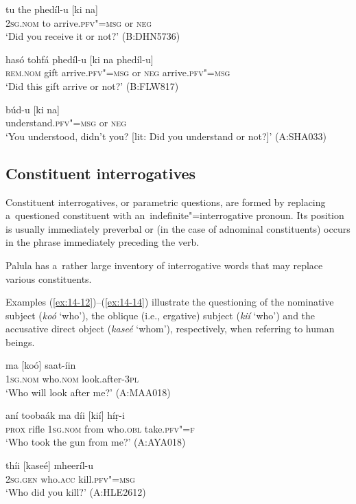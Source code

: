 \begin{exe}
\ex
\label{ex:14-9}
\gll tu the phedíl-u [ki na] \\
\textsc{2sg.nom} to arrive.\textsc{pfv"=msg} or \textsc{neg} \\
\glt `Did you receive it or not?' (B:DHN5736)

\ex
\label{ex:14-10}
\gll hasó tohfá phedíl-u [ki na phedíl-u]  \\
\textsc{rem.nom} gift arrive.\textsc{pfv"=msg} or \textsc{neg}  arrive.\textsc{pfv"=msg} \\
\glt `Did this gift arrive or not?' (B:FLW817)

\ex
\label{ex:14-11}
\gll búd-u [ki na] \\
understand.\textsc{pfv"=msg} or \textsc{neg} \\
\glt `You understood, didn't you? [lit: Did you understand or not?]' (A:SHA033)
\end{exe}
\subsection{Constituent interrogatives}
\label{subsec:14-2-2}

Constituent interrogatives, or parametric questions, are formed by replacing a~questioned constituent with an~indefinite"=interrogative pronoun. Its position is usually immediately preverbal or (in the case of adnominal constituents) occurs in the phrase immediately preceding the verb.


Palula has a~rather large inventory of interrogative words that may replace various constituents.


 Examples (\ref{ex:14-12})--(\ref{ex:14-14}) illustrate the questioning of the nominative subject (\textit{koó} `who'), the oblique (i.e., ergative) subject (\textit{kií} `who') and the accusative direct object (\textit{kaseé} `whom'), respectively, when referring to human beings.

\begin{exe}
\ex
\label{ex:14-12}
\gll ma [koó] saat-íin \\
\textsc{1sg}.\textsc{nom} who.\textsc{nom} look.after-\textsc{3pl} \\
\glt `Who will look after me?' (A:MAA018)

\ex
\label{ex:14-13}
\gll aní toobaák ma díi [kií] híṛ-i\\
\textsc{prox} rifle \textsc{1sg.nom} from who.\textsc{obl} take.\textsc{pfv"=f} \\
\glt `Who took the gun from me?' (A:AYA018)

\ex
\label{ex:14-14}
\gll thíi [kaseé] mheeríl-u \\
\textsc{2sg.gen} who.\textsc{acc} kill.\textsc{pfv"=msg} \\
\glt `Who did you kill?' (A:HLE2612)
\end{exe}

